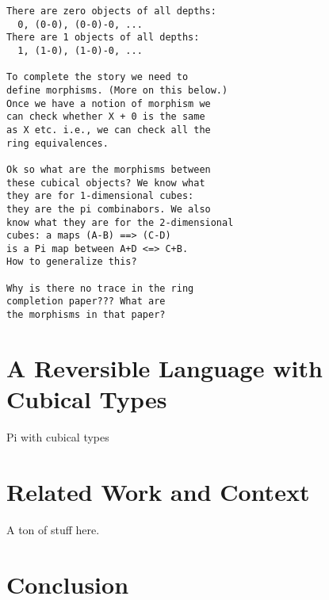 \documentclass[authoryear,preprint]{sigplanconf}
\begin{document}
\begin{verbatim}
There are zero objects of all depths:
  0, (0-0), (0-0)-0, ...
There are 1 objects of all depths:
  1, (1-0), (1-0)-0, ...

To complete the story we need to 
define morphisms. (More on this below.)
Once we have a notion of morphism we 
can check whether X + 0 is the same
as X etc. i.e., we can check all the 
ring equivalences. 

Ok so what are the morphisms between 
these cubical objects? We know what
they are for 1-dimensional cubes: 
they are the pi combinabors. We also
know what they are for the 2-dimensional 
cubes: a maps (A-B) ==> (C-D) 
is a Pi map between A+D <=> C+B. 
How to generalize this? 

Why is there no trace in the ring 
completion paper??? What are 
the morphisms in that paper?
\end{verbatim}

\section{A Reversible Language with Cubical Types} 

Pi with cubical types

\section{Related Work and Context}

A ton of stuff here. 

\section{Conclusion}


\softraggedright

\end{document}
